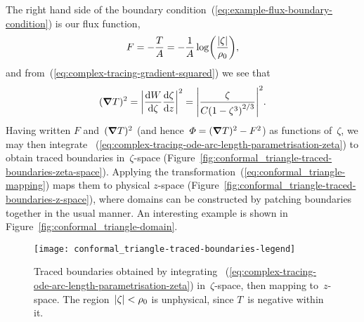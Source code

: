 The right hand side
of the boundary condition~(\ref{eq:example-flux-boundary-condition})
is our flux function,
\begin{equation}
  F = -\frac{T}{A} = -\frac{1}{A} \log \roundbr*{\frac{\abs{\zeta}}{\rho_0}},
  \label{eq:conformal_triangle-flux-function}
\end{equation}
and from~(\ref{eq:complex-tracing-gradient-squared})
we see that
\begin{equation}
  (\del T)^2
    = \abs*{\tder{W}{\zeta} \tder{\zeta}{z}}^2
    = \abs*{\frac{\zeta}{C \roundbr*{1 - \zeta^3}^{2/3}}}^2.
  \label{eq:conformal_triangle-gradient-squared}
\end{equation}
Having written $F$ and~$(\mathop{}\!\boldsymbol{\mathbf{\nabla}} T)^2$
(and hence~$\varPhi = (\mathop{}\!\boldsymbol{\mathbf{\nabla}} T)^2 - F^2$)
as functions of~$\zeta$,
we may then integrate~%
  (\ref{eq:complex-tracing-ode-arc-length-parametrisation-zeta})
to obtain traced boundaries in~$\zeta$-space
(Figure~\ref{fig:conformal_triangle-traced-boundaries-zeta-space}).
Applying the transformation~(\ref{eq:conformal_triangle-mapping})
maps them to physical $z$-space
(Figure~\ref{fig:conformal_triangle-traced-boundaries-z-space}),
where domains can be constructed
by patching boundaries together in the usual manner.
An interesting example is shown in Figure~\ref{fig:conformal_triangle-domain}.

\begin{figure}
  \newcommand*{\subfigurewidth}{0.47\textwidth}
  \texttt{[image: conformal\_triangle-traced-boundaries-legend]}
  \begin{subfigure}[t]{\subfigurewidth}
  \end{subfigure}
    \hfill
  \begin{subfigure}[t]{\subfigurewidth}
  \end{subfigure}
  \caption{
    Traced boundaries obtained by integrating~%
      (\ref{eq:complex-tracing-ode-arc-length-parametrisation-zeta})
    in~$\zeta$-space,
    then mapping to~$z$-space.
    The region~$\lvert\zeta\rvert < \rho_0$ is unphysical,
    since $T$~is negative within it.
  }
  \label{fig:conformal_triangle-traced-boundaries}
\end{figure}

\begin{figure}
\end{figure}
